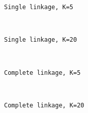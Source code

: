 \documentclass[11pt]{article}
\begin{document}
    \begin{Verbatim}[commandchars=\\\{\}]
Single linkage, K=5

    \end{Verbatim}

    \begin{center}
    \end{center}
    { \hspace*{\fill} \\}
    
    \begin{Verbatim}[commandchars=\\\{\}]
Single linkage, K=20

    \end{Verbatim}

    \begin{center}
    \end{center}
    { \hspace*{\fill} \\}
    
    \begin{Verbatim}[commandchars=\\\{\}]
Complete linkage, K=5

    \end{Verbatim}

    \begin{center}
    \end{center}
    { \hspace*{\fill} \\}
    
    \begin{Verbatim}[commandchars=\\\{\}]
Complete linkage, K=20

    \end{Verbatim}

    \begin{center}
    \end{center}
    { \hspace*{\fill} \\}
    
\end{document}
